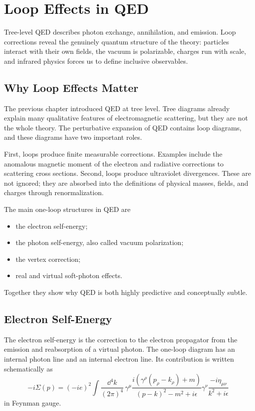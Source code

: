 \chapter{Loop Effects in QED}

\begin{remarkbox}
Tree-level QED describes photon exchange, annihilation, and emission. Loop
corrections reveal the genuinely quantum structure of the theory: particles
interact with their own fields, the vacuum is polarizable, charges run with
scale, and infrared physics forces us to define inclusive observables.
\end{remarkbox}

\section{Why Loop Effects Matter}

The previous chapter introduced QED at tree level. Tree diagrams already explain
many qualitative features of electromagnetic scattering, but they are not the
whole theory. The perturbative expansion of QED contains loop diagrams, and
these diagrams have two important roles.

First, loops produce finite measurable corrections. Examples include the
anomalous magnetic moment of the electron and radiative corrections to
scattering cross sections. Second, loops produce ultraviolet divergences. These
are not ignored; they are absorbed into the definitions of physical masses,
fields, and charges through renormalization.

The main one-loop structures in QED are
\begin{itemize}
    \item the electron self-energy;
    \item the photon self-energy, also called vacuum polarization;
    \item the vertex correction;
    \item real and virtual soft-photon effects.
\end{itemize}
Together they show why QED is both highly predictive and conceptually subtle.

\section{Electron Self-Energy}

The electron self-energy is the correction to the electron propagator from the
emission and reabsorption of a virtual photon. The one-loop diagram has an
internal photon line and an internal electron line. Its contribution is written
schematically as
\[
    -i\Sigma(p)
    = (-ie)^2\int\frac{\dd^4k}{(2\pi)^4}\,
      \gamma^\mu
      \frac{i(\gamma^\rho(p_\rho-k_\rho)+m)}{(p-k)^2-m^2+i\epsilon}
      \gamma^\nu
      \frac{-i\eta_{\mu\nu}}{k^2+i\epsilon}
\]
in Feynman gauge.

